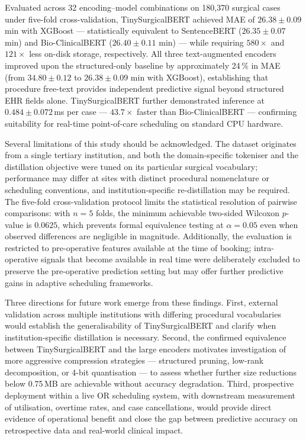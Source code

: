 \documentclass[3p]{elsarticle}
\begin{document}
Evaluated across 32 encoding--model combinations on 180{,}370 surgical cases under five-fold cross-validation, TinySurgicalBERT achieved MAE of $26.38 \pm 0.09$ min with XGBoost --- statistically equivalent to SentenceBERT ($26.35 \pm 0.07$ min) and Bio-ClinicalBERT ($26.40 \pm 0.11$ min) --- while requiring $580\times$ and $121\times$ less on-disk storage, respectively. All three text-augmented encoders improved upon the structured-only baseline by approximately 24\,\% in MAE (from $34.80 \pm 0.12$ to $26.38 \pm 0.09$ min with XGBoost), establishing that procedure free-text provides independent predictive signal beyond structured EHR fields alone. TinySurgicalBERT further demonstrated inference at $0.484 \pm 0.072$\,ms per case --- $43.7\times$ faster than Bio-ClinicalBERT --- confirming suitability for real-time point-of-care scheduling on standard CPU hardware.

Several limitations of this study should be acknowledged. The dataset originates from a single tertiary institution, and both the domain-specific tokeniser and the distillation objective were tuned on its particular surgical vocabulary; performance may differ at sites with distinct procedural nomenclature or scheduling conventions, and institution-specific re-distillation may be required. The five-fold cross-validation protocol limits the statistical resolution of pairwise comparisons: with $n = 5$ folds, the minimum achievable two-sided Wilcoxon $p$-value is $0.0625$, which prevents formal equivalence testing at $\alpha = 0.05$ even when observed differences are negligible in magnitude. Additionally, the evaluation is restricted to pre-operative features available at the time of booking; intra-operative signals that become available in real time were deliberately excluded to preserve the pre-operative prediction setting but may offer further predictive gains in adaptive scheduling frameworks.

Three directions for future work emerge from these findings. First, external validation across multiple institutions with differing procedural vocabularies would establish the generalisability of TinySurgicalBERT and clarify when institution-specific distillation is necessary. Second, the confirmed equivalence between TinySurgicalBERT and the large encoders motivates investigation of more aggressive compression strategies --- structured pruning, low-rank decomposition, or 4-bit quantisation --- to assess whether further size reductions below 0.75\,MB are achievable without accuracy degradation. Third, prospective deployment within a live OR scheduling system, with downstream measurement of utilisation, overtime rates, and case cancellations, would provide direct evidence of operational benefit and close the gap between predictive accuracy on retrospective data and real-world clinical impact.
\end{document}
